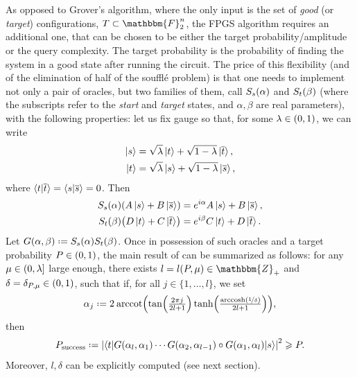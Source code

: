 \documentclass[reqno, 10pt]{amsart}
\numberwithin{equation}{section}                     %
\let\originalleft\left
\let\originalright\right
\renewcommand{\left}{\mathopen{}\mathclose\bgroup\originalleft}
\renewcommand{\right}{\aftergroup\egroup\originalright}
\def\({\mathopen{}\left(}
\def\){\right)\mathclose{}}
\newcommand*{\eqdef}{\mathrel{\vcenter{\baselineskip0.5ex \lineskiplimit0pt\hbox{.}\hbox{.}}}=}
\def\F{\mathbbm{F}}
\def\Z{\mathbbm{Z}}
\begin{document}
As opposed to Grover's algorithm, where the only input is the set of \emph{good} (or \emph{target}) configurations, $T \subset \F_2^n$, the FPGS algorithm requires an additional one, that can be chosen to be either the target probability/amplitude or the query complexity. The target probability is the probability of finding the system in a good state after running the circuit. The price of this flexibility (and of the elimination of half of the souffl\'e problem) is that one needs to implement not only a pair of oracles, but two families of them, call $S_s \( \alpha \)$ and $S_t \( \beta \)$ (where the subscripts refer to the \emph{start} and \emph{target} states, and $\alpha, \beta$ are real parameters), with the following properties: let us fix gauge so that, for some $\lambda \in \( 0, 1 \)$, we can write
\begin{align}
    \ket{s}  &= \sqrt{\lambda} \ket{t} + \sqrt{1 - \lambda} \ket{\overline{t}}, \\
    \ket{t}  &= \sqrt{\lambda} \ket{s} + \sqrt{1 - \lambda} \ket{\overline{s}},
\end{align}
where $\braket{t | \overline{t}} = \braket{s | \overline{s}} = 0$. Then
\begin{align}
    S_s \( \alpha \) \( A \ket{s} + B \ket{\overline{s}} \) &= e^{i \alpha} A \ket{s} + B \ket{\overline{s}}, \\
    S_t \( \beta \) \( D \ket{t} + C \ket{\overline{t}} \)  &= e^{i \beta} C \ket{t} + D \ket{\overline{t}}.
\end{align}
Let $G \( \alpha, \beta \) \eqdef S_s \( \alpha \) S_t \( \beta \)$. Once in possession of such oracles and a target probability $P \in \( 0, 1 \)$, the main result of \cite{yoder_fixed_2014} can be summarized as follows: for any $\mu \in \( 0, \lambda \right]$ large enough, there exists $l = l \( P, \mu \) \in \Z_+$ and $\delta = \delta_{P, \mu} \in \( 0, 1 \)$, such that if, for all $j \in \{ 1, \ldots, l \}$, we set
\begin{equation}
    \alpha_j \eqdef 2 \: \mathrm{arccot} \( \tan \( \tfrac{2 \pi j}{2 l + 1} \) \tanh \( \tfrac{\mathrm{arccosh} \( \nicefrac{1}{\delta} \)}{2 l + 1} \) \),
\end{equation}
then
\begin{equation}
    P_{\mathrm{success}} \eqdef \left| \left\langle t \middle| G \( \alpha_l, \alpha_1 \) \cdots G \( \alpha_2, \alpha_{l - 1} \) \circ G \( \alpha_1, \alpha_l \) \middle| s \right\rangle \right|^2 \geqslant P.
\end{equation}
Moreover, $l, \delta$ can be explicitly computed (see next section).
\end{document}
